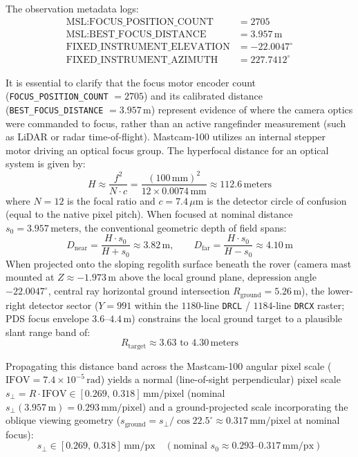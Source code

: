 \documentclass[11pt,a4paper]{article}
\begin{document}
The observation metadata logs:
\begin{align*}
	\text{MSL:FOCUS\_POSITION\_COUNT}   & = 2705            \\
	\text{MSL:BEST\_FOCUS\_DISTANCE}    & = 3.957\,\text{m} \\
	\text{FIXED\_INSTRUMENT\_ELEVATION} & = -22.0047^\circ  \\
	\text{FIXED\_INSTRUMENT\_AZIMUTH}   & = 227.7412^\circ
\end{align*}

It is essential to clarify that the focus motor encoder count (\texttt{FOCUS\_POSITION\_COUNT} $= 2705$) and its calibrated distance (\texttt{BEST\_FOCUS\_DISTANCE} $= 3.957\,\text{m}$) represent evidence of where the camera optics were commanded to focus, rather than an active rangefinder measurement (such as LiDAR or radar time-of-flight). Mastcam-100 utilizes an internal stepper motor driving an optical focus group. The hyperfocal distance for an optical system is given by:
\begin{equation}
	H \approx \frac{f^2}{N \cdot c} = \frac{(100\,\text{mm})^2}{12 \times 0.0074\,\text{mm}} \approx 112.6\,\text{meters}
\end{equation}
where $N = 12$ is the focal ratio and $c = 7.4\,\mu\text{m}$ is the detector circle of confusion (equal to the native pixel pitch). When focused at nominal distance $s_0 = 3.957\,\text{meters}$, the conventional geometric depth of field spans:
\begin{equation}
	D_{\text{near}} = \frac{H \cdot s_0}{H + s_0} \approx 3.82\,\text{m}, \qquad D_{\text{far}} = \frac{H \cdot s_0}{H - s_0} \approx 4.10\,\text{m}
\end{equation}
When projected onto the sloping regolith surface beneath the rover (camera mast mounted at $Z \approx -1.973\,\text{m}$ above the local ground plane, depression angle $-22.0047^\circ$, central ray horizontal ground intersection $R_{\text{ground}} = 5.26\,\text{m}$), the lower-right detector sector ($Y = 991$ within the $1180$-line \texttt{DRCL} / $1184$-line \texttt{DRCX} raster; PDS focus envelope $3.6\text{--}4.4\,\text{m}$) constrains the local ground target to a plausible slant range band of:
\begin{equation}
	R_{\text{target}} \approx 3.63\text{ to } 4.30\,\text{meters}
\end{equation}

Propagating this distance band across the Mastcam-100 angular pixel scale ($\text{IFOV} = 7.4 \times 10^{-5}\,\text{rad}$) yields a normal (line-of-sight perpendicular) pixel scale $s_{\perp} = R \cdot \text{IFOV} \in [0.269,\, 0.318]\,\text{mm/pixel}$ (nominal $s_{\perp}(3.957\,\text{m}) = 0.293\,\text{mm/pixel}$) and a ground-projected scale incorporating the oblique viewing geometry ($s_{\text{ground}} = s_{\perp}/\cos 22.5^\circ \approx 0.317\,\text{mm/pixel}$ at nominal focus):
\begin{equation}
	s_{\perp} \in [0.269,\, 0.318]\,\text{mm/px} \quad (\text{nominal } s_0 \approx 0.293\text{--}0.317\,\text{mm/px})
\end{equation}
\end{document}
